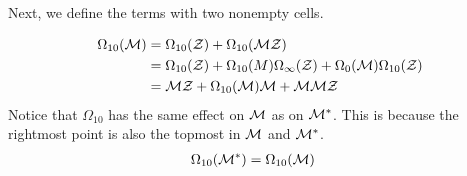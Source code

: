 \documentclass[12pt, a4paper, twoside]{report}
\begin{document}
Next, we define the terms with two nonempty cells.

\begin{align}
  \begin{aligned}
    \Omega_{10}(\mathcal{M}) &= \Omega_{10}(\mathcal{Z}) + \Omega_{10}(\mathcal{M}\mathcal{Z})\\
    &= \Omega_{10}(\mathcal{Z}) + \Omega_{10}(M)\Omega_\infty(\mathcal{Z}) + \Omega_0(\mathcal{M})\Omega_{10}(\mathcal{Z})\\
    &= \mathcal{M}\mathcal{Z} + \Omega_{10}(\mathcal{M})\mathcal{M} + \mathcal{M}\mathcal{M}\mathcal{Z}
  \end{aligned}
      \label{eq:mmm_omega10M}
\end{align}
Notice that $\Omega_{10}$ has the same effect on $\mathcal{M}$ as on $\mathcal{M}^*$. This is because the rightmost point is also the topmost in $\mathcal{M}$ and $\mathcal{M}^*$. 
\begin{align}
  \Omega_{10}(\mathcal{M}^*) &= \Omega_{10}(\mathcal{M})
  \label{eq:mmm_omega10Mstar}
\end{align}
\end{document}
